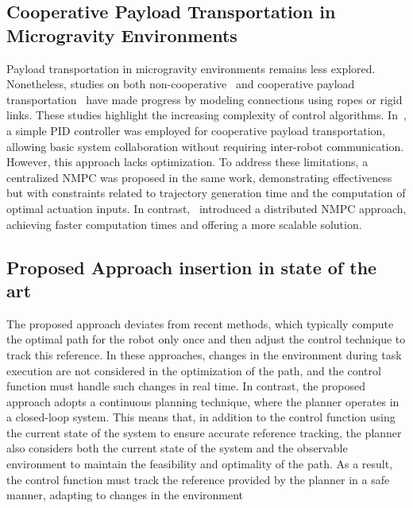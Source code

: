 \subsection{Cooperative Payload Transportation in Microgravity Environments}

Payload transportation in microgravity environments remains less explored. Nonetheless, studies on both non-cooperative~\cite{correia2021payload} and cooperative payload transportation~\cite{farivarnejad2021fully,correia2021payload,phodapol2024collaborative} have made progress by modeling connections using ropes or rigid links. These studies highlight the increasing complexity of control algorithms. In~\cite{farivarnejad2021fully}, a simple PID controller was employed for cooperative payload transportation, allowing basic system collaboration without requiring inter-robot communication. However, this approach lacks optimization. To address these limitations, a centralized NMPC was proposed in the same work, demonstrating effectiveness but with constraints related to trajectory generation time and the computation of optimal actuation inputs. In contrast,~\cite{phodapol2024collaborative} introduced a distributed NMPC approach, achieving faster computation times and offering a more scalable solution.

\subsection{Proposed Approach insertion in state of the art}

The proposed approach deviates from recent methods, which typically compute the optimal path for the robot only once and then adjust the control technique to track this reference. In these approaches, changes in the environment during task execution are not considered in the optimization of the path, and the control function must handle such changes in real time. In contrast, the proposed approach adopts a continuous planning technique, where the planner operates in a closed-loop system. This means that, in addition to the control function using the current state of the system to ensure accurate reference tracking, the planner also considers both the current state of the system and the observable environment to maintain the feasibility and optimality of the path. As a result, the control function must track the reference provided by the planner in a safe manner, adapting to changes in the environment

